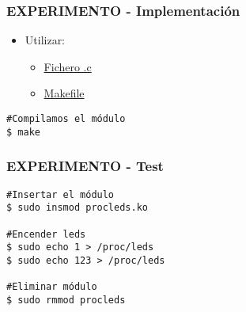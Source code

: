 \begin{frame}[fragile]
\frametitle{EXPERIMENTO - Implementación}
  \begin{itemize}
    \item Utilizar:
       \begin{itemize}
          \item \href{https://github.com/unlp-so/contenidos/blob/master/explicaciones/so/practica3/experiment/procleds.c}{Fichero .c}
          \item \href{https://github.com/unlp-so/contenidos/blob/master/explicaciones/so/practica3/experiment/Makefile}{Makefile}
       \end{itemize}
  \end{itemize}
  \begin{lstlisting}
#Compilamos el módulo
$ make
  \end{lstlisting}
\end{frame}

\begin{frame}[fragile]
\frametitle{EXPERIMENTO - Test}
  \begin{lstlisting}
#Insertar el módulo
$ sudo insmod procleds.ko

#Encender leds
$ sudo echo 1 > /proc/leds
$ sudo echo 123 > /proc/leds

#Eliminar módulo
$ sudo rmmod procleds
  \end{lstlisting}
\end{frame}
